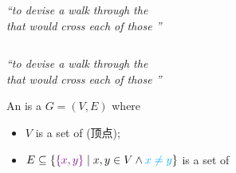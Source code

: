 
\begin{frame}{}

  \pause
  \begin{center}
    {\it ``to devise a walk through the  \\
    that would cross each of those  ''}
  \end{center}
\end{frame}

\begin{frame}{}
  \begin{columns}
  \end{columns}
\end{frame}

\begin{frame}{}
  \begin{columns}
  \end{columns}

  \pause
  \vspace{0.60cm}
  \begin{center}
    {\it ``to devise a walk through the  \\
    that would cross each of those  ''}
  \end{center}
\end{frame}

\begin{frame}{}
  \begin{definition}[Graph (图)]
    An  is a  $G = (V, E)$ where \\[6pt]
    \begin{itemize}
      \setlength{\itemsep}{5pt}
      \item $V$ is a set of  (顶点);
      \item $E \subseteq \{\textcolor{violet}{\{x, y\}} \mid x, y \in V \land \textcolor{cyan}{x \neq y}\}$
        is a set of 
    \end{itemize}
  \end{definition}

  \vspace{0.30cm}
\end{frame}

